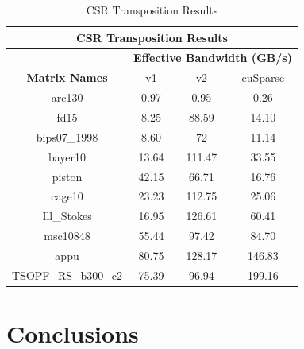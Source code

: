 \documentclass{IEEEconf}
\begin{document}
\begin{table}[h]
    \begin{tabular}{|cccc|}
    \hline
    \multicolumn{4}{|c|}{\textbf{CSR Transposition Results}}                                                          \\ \hline
    \multicolumn{1}{|l|}{}                      & \multicolumn{3}{c|}{\textbf{Effective Bandwidth (GB/s)}}            \\ \hline
    \multicolumn{1}{|c|}{\textbf{Matrix Names}} & \multicolumn{1}{c|}{v1}    & \multicolumn{1}{c|}{v2}     & cuSparse \\ \hline
    \multicolumn{1}{|c|}{arc130}                & \multicolumn{1}{c|}{0.97}  & \multicolumn{1}{c|}{0.95}   & 0.26     \\ \hline
    \multicolumn{1}{|c|}{fd15}                  & \multicolumn{1}{c|}{8.25}  & \multicolumn{1}{c|}{88.59}  & 14.10    \\ \hline
    \multicolumn{1}{|c|}{bips07\_1998}          & \multicolumn{1}{c|}{8.60}  & \multicolumn{1}{c|}{72}     & 11.14    \\ \hline
    \multicolumn{1}{|c|}{bayer10}               & \multicolumn{1}{c|}{13.64} & \multicolumn{1}{c|}{111.47} & 33.55    \\ \hline
    \multicolumn{1}{|c|}{piston}                & \multicolumn{1}{c|}{42.15} & \multicolumn{1}{c|}{66.71}  & 16.76    \\ \hline
    \multicolumn{1}{|c|}{cage10}                & \multicolumn{1}{c|}{23.23} & \multicolumn{1}{c|}{112.75} & 25.06    \\ \hline
    \multicolumn{1}{|c|}{Ill\_Stokes}           & \multicolumn{1}{c|}{16.95} & \multicolumn{1}{c|}{126.61} & 60.41    \\ \hline
    \multicolumn{1}{|c|}{msc10848}              & \multicolumn{1}{c|}{55.44} & \multicolumn{1}{c|}{97.42}  & 84.70    \\ \hline
    \multicolumn{1}{|c|}{appu}                  & \multicolumn{1}{c|}{80.75} & \multicolumn{1}{c|}{128.17} & 146.83   \\ \hline
    \multicolumn{1}{|c|}{TSOPF\_RS\_b300\_c2}   & \multicolumn{1}{c|}{75.39} & \multicolumn{1}{c|}{96.94}  & 199.16   \\ \hline
    \end{tabular}
    \caption{CSR Transposition Results}
    \label{tab:csr_results}
\end{table}
\section{Conclusions}

\clearpage


\end{document}
